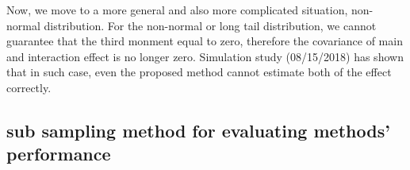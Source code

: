 \documentclass[]{article}
\begin{document}
Now, we move to a more general and also more complicated situation,
non-normal distribution. For the non-normal or long tail distribution,
we cannot guarantee that the third monment equal to zero, therefore the
covariance of main and interaction effect is no longer zero. Simulation
study (08/15/2018) has shown that in such case, even the proposed method
cannot estimate both of the effect correctly.

\subsection{sub sampling method for evaluating methods'
performance}\label{sub-sampling-method-for-evaluating-methods-performance}
\end{document}
